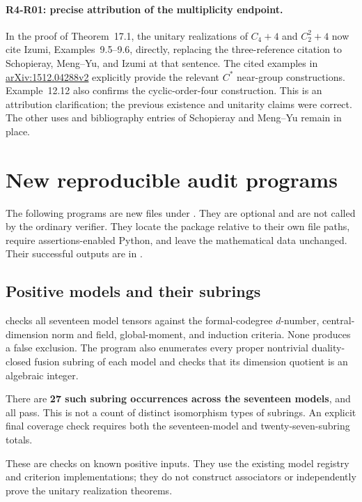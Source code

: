 \documentclass[11pt,a4paper]{article}
\begin{document}
\paragraph{R4-R01: precise attribution of the multiplicity endpoint.}
In the proof of Theorem~17.1, the unitary realizations of $C_4+4$ and
$C_2^2+4$ now cite Izumi, Examples~9.5--9.6, directly, replacing the
three-reference citation to Schopieray, Meng--Yu, and Izumi at that
sentence. The cited examples in
\href{https://arxiv.org/pdf/1512.04288v2}{arXiv:1512.04288v2}
explicitly provide the relevant $C^*$ near-group constructions.
Example~12.12 also confirms the cyclic-order-four construction.
This is an attribution clarification; the previous existence and
unitarity claims were correct. The other uses and bibliography
entries of Schopieray and Meng--Yu remain in place.

\section{New reproducible audit programs}

The following programs are new files under .
They are optional and are not called by the ordinary verifier.
They locate the package relative to their own file paths, require
assertions-enabled Python, and leave the mathematical data unchanged.
Their successful outputs are in
.

\subsection{Positive models and their subrings}

 checks all seventeen model
tensors against the formal-codegree $d$-number, central-dimension
norm and field, global-moment, and induction criteria. None produces
a false exclusion. The program also enumerates every proper
nontrivial duality-closed fusion subring of each model and checks
that its dimension quotient is an algebraic integer.

There are \textbf{27 such subring occurrences across the seventeen
models}, and all pass. This is not a count of distinct isomorphism
types of subrings. An explicit final coverage check requires both
the seventeen-model and twenty-seven-subring totals.

These are checks on known positive inputs. They use the existing
model registry and criterion implementations; they do not construct
associators or independently prove the unitary realization theorems.
\end{document}
